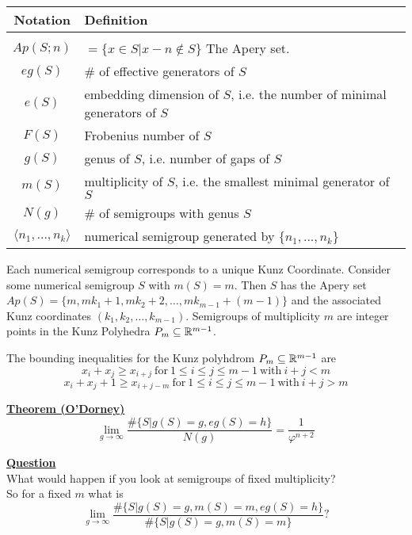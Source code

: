 \begin{table}[!h]
    \centering
    \begin{tabularx}{\textwidth}{c|X}
        Notation & Definition \\
        \hline \\
         $Ap(S;n)$ & $= \{ x \in S | x - n \not \in S \}$ The Apery set. \\
         $eg(S)$ & # of effective generators of $S$ \\
         $e(S)$ & embedding dimension of $S$, i.e. the number of minimal generators of $S$ \\
         $F(S)$ & Frobenius number of $S$ \\
         $g(S)$ & genus of $S$, i.e. number of gaps of $S$ \\
         $m(S)$ & multiplicity of $S$, i.e. the smallest minimal generator of $S$ \\
         $N(g)$ & \# of semigroups with genus $S$ \\
         $\langle n_1,..., n_k \rangle$ & numerical semigroup generated by $\{n_1, ...,n_k\}$
    \end{tabularx}
\end{table}

Each numerical semigroup corresponds to a unique Kunz Coordinate. Consider some numerical semigroup $S$ with $m(S) = m$. Then $S$ has the Apery set $Ap(S) = \{m, mk_1 + 1, mk_2 + 2, \dots, mk_{m-1} + (m-1) \}$ and the associated Kunz coordinates $(k_1, k_2, \dots, k_{m-1}).$ Semigroups of multiplicity $m$ are integer points in the Kunz Polyhedra $P_m \subseteq \mathbb{R} ^{m-1}$.  

The bounding inequalities for the Kunz polyhdrom $P_m \subseteq \mathbb{R}^{m-1}$ are 
$$x_i + x_j \geq x_{i+j} \ \text{for} \ 1 \leq i \leq j \leq m - 1 \ \text{with} \ i + j < m$$
$$x_i + x_j + 1 \geq x_{i+j-m} \ \text{for} \ 1 \leq i \leq j \leq m - 1 \ \text{with} \ i + j > m$$

\underline{\textbf{Theorem (O'Dorney)}}
$$\lim_{g \to \infty} \frac{\# \{S | g(S) = g, eg(S) = h \}}{N(g)} = \frac{1}{\varphi^{n+2}}$$

\underline{\textbf{Question}} \\
What would happen if you look at semigroups of fixed multiplicity? \\
So for a fixed $m$ what is $$\lim_{g \to \infty} \frac{\# \{S | g(S) = g, m(S)=m, eg(S) = h \}}{\# \{ S | g(S) = g, m(S) = m\}} ?$$

